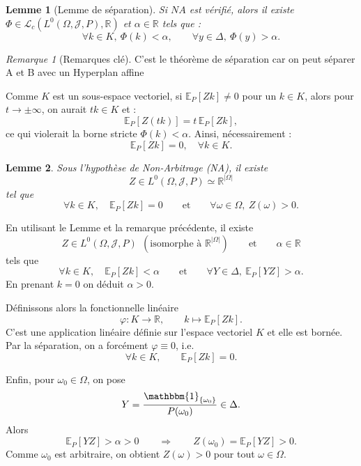 \documentclass[12pt,a4paper]{article}
\makeatletter
\numberwithin{equation}{section}
\theoremstyle{plain} %
\newtheorem{lemme}{Lemme}
\theoremstyle{definition} %
\theoremstyle{remark} %
\newtheorem*{remarque}{Remarque}
\theoremstyle{myexample}
\theoremstyle{definition}
\renewenvironment{proof}[1][\proofname]{%
  \par\vspace{0.8em}%
  \pushQED{\qed}%
  \normalfont\color{cyan}%
  \topsep6\p@\@plus6\p@\relax
  \trivlist
  \item[\hskip\labelsep\bfseries\color{cyan}#1\@addpunct{.}]\ignorespaces
}{%
  \popQED\endtrivlist\vspace{0.8em}%
}
\newcommand{\E}{\mathbb{E}}
\newcommand{\RR}{\mathbb{R}}
\makeatother
\begin{document}
\begin{lemme}[Lemme de séparation] \label{lem:6}
Si $NA$ est vérifié, alors il existe $\Phi \in \mathcal{L}_c(L^0(\Omega, \mathcal{J}, P), \mathbb{R})$ et $\alpha \in \mathbb{R}$ tels que :
\[
\forall k \in K,\ \Phi(k) < \alpha, \qquad \forall y \in \Delta,\ \Phi(y) > \alpha.
\]
\end{lemme}

\begin{remarque}[Remarques clé]
\item C'est le théorème de séparation car on peut séparer A et B avec un Hyperplan affine
\item Comme $K$ est un sous-espace vectoriel, si $\mathbb{E}_P[Zk] \neq 0$ pour un $k \in K$,  
alors pour $t \to \pm\infty$, on aurait $tk \in K$ et :
\[
\mathbb{E}_P[Z(tk)] = t \, \mathbb{E}_P[Zk],
\]
ce qui violerait la borne stricte $\Phi(k) < \alpha$.  
Ainsi, nécessairement :
\[
\mathbb{E}_P[Zk] = 0,\quad \forall k \in K.
\]
\end{remarque}


\begin{lemme}\label{lem:7}
Sous l'hypothèse de Non-Arbitrage (NA), il existe
\[
 Z\in L^0(\Omega,\mathcal{J},P)\simeq \RR^{|\Omega|}
\]
tel que
\[
\forall k\in K,\quad \E_P[Zk]=0
\qquad\text{et}\qquad
\forall \omega\in\Omega,\ Z(\omega)>0 .
\]
\end{lemme}

\begin{proof}[Preuve du lemme]
En utilisant le Lemme  et la remarque précédente, il existe
\[
 Z\in L^0(\Omega,\mathcal{J},P)\ \ (\text{isomorphe à } \RR^{|\Omega|})
 \qquad\text{et}\qquad
 \alpha\in\RR
\]
tels que
\[
\forall k\in K,\quad \E_P[Zk]<\alpha
\qquad\text{et}\qquad
\forall Y\in\Delta,\ \E_P[YZ]>\alpha .
\]
En prenant $k=0$ on déduit $\alpha>0$.

Définissons alors la fonctionnelle linéaire
\[
\varphi:K\longrightarrow\RR,\qquad
k\longmapsto \E_P[Zk] .
\]
C’est une application linéaire définie sur l’espace vectoriel $K$ et elle est bornée.
Par la séparation, on a forcément $\varphi\equiv 0$, i.e.
\[
\forall k\in K,\qquad \E_P[Zk]=0.
\]

Enfin, pour $\omega_0\in\Omega$, on pose
\[
Y=\frac{\mathbbm{1}_{\{\omega_0\}}}{P(\omega_0)}\in\Delta.
\]
Alors
\[
\E_P[YZ]>\alpha>0
\qquad\Longrightarrow\qquad
Z(\omega_0)=\E_P[YZ]>0 .
\]
Comme $\omega_0$ est arbitraire, on obtient $Z(\omega)>0$ pour tout $\omega\in\Omega$.
\end{proof}
\end{document}
